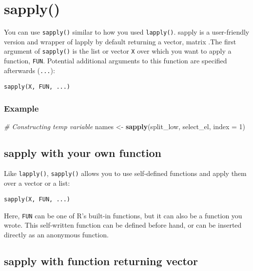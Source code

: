 \documentclass[
]{book}
\newenvironment{Shaded}{\begin{snugshade}}{\end{snugshade}}
\newcommand{\CommentTok}[1]{\textcolor[rgb]{0.56,0.35,0.01}{\textit{#1}}}
\newcommand{\DataTypeTok}[1]{\textcolor[rgb]{0.13,0.29,0.53}{#1}}
\newcommand{\DecValTok}[1]{\textcolor[rgb]{0.00,0.00,0.81}{#1}}
\newcommand{\KeywordTok}[1]{\textcolor[rgb]{0.13,0.29,0.53}{\textbf{#1}}}
\newcommand{\NormalTok}[1]{#1}
\newcommand{\StringTok}[1]{\textcolor[rgb]{0.31,0.60,0.02}{#1}}
\begin{document}
\hypertarget{sapply}{%
\section{sapply()}\label{sapply}}

You can use \texttt{sapply()} similar to how you used \texttt{lapply()}. sapply is a user-friendly version and wrapper of lapply by default returning a vector, matrix .The first argument of \texttt{sapply()} is the list or vector \texttt{X} over which you want to apply a function, \texttt{FUN}. Potential additional arguments to this function are specified afterwards (\texttt{...}):

\begin{verbatim}
sapply(X, FUN, ...)
\end{verbatim}

\hypertarget{example-3}{%
\subsubsection{Example}\label{example-3}}

\begin{Shaded}
\begin{Highlighting}[]
\CommentTok{# Constructing temp variable}
\NormalTok{names <-}\StringTok{ }\KeywordTok{sapply}\NormalTok{(split_low, select_el, }\DataTypeTok{index =} \DecValTok{1}\NormalTok{)}
\end{Highlighting}
\end{Shaded}

\hypertarget{sapply-with-your-own-function}{%
\subsection{sapply with your own function}\label{sapply-with-your-own-function}}

Like \texttt{lapply()}, \texttt{sapply()} allows you to use self-defined functions and apply them over a vector or a list:

\begin{verbatim}
sapply(X, FUN, ...)
\end{verbatim}

Here, \texttt{FUN} can be one of R's built-in functions, but it can also be a function you wrote. This self-written function can be defined before hand, or can be inserted directly as an anonymous function.

\hypertarget{sapply-with-function-returning-vector}{%
\subsection{sapply with function returning vector}\label{sapply-with-function-returning-vector}}
\end{document}
